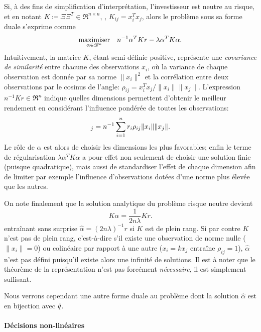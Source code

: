 Si, à des fins de simplification d'interprétation, l'investisseur est neutre au risque, et
en notant $K \coloneq \Xi\Xi^T \in \Re^{n \times n}$, \ie, $K_{ij} = x_i^Tx_j$, alors le problème sous sa
forme duale s'exprime comme
\begin{equation}
  \label{k:dualrn}
  \maximizeEquation[\alpha \in \Re^n]{n^{-1}\alpha^TKr - \lambda\alpha^TK\alpha.}
\end{equation}
Intuitivement, la matrice $K$, étant semi-définie positive, représente une
\textit{covariance de similarité} entre chacune des observations $x_i$, où la variance de
chaque observation est donnée par sa norme $\|x_i\|^2$ et la corrélation entre deux
observations par le cosinus de l'angle: $\rho_{ij} = x_i^Tx_j/\|x_i\|\|x_j\|$. L'expression
$n^{-1}Kr \in \Re^n$ indique quelles dimensions permettent d'obtenir le meilleur rendement en
considérant l'influence pondérée de toutes les observations:
\begin{equation}
  [Kr]_j = n^{-1}\sumi r_i\rho_{ij}\|x_i\|\|x_j\|.
\end{equation}
Le rôle de $\alpha$ est alors de choisir les dimensions les plus favorables; enfin le terme de
régularisation $\lambda\alpha^TK\alpha$ a pour effet non seulement de choisir une solution finie (puisque
quadratique), mais aussi de standardiser l'effet de chaque dimension afin de limiter par
exemple l'influence d'observations dotées d'une norme plus élevée que les autres.

On note finalement que la solution analytique du problème risque neutre devient
\begin{equation}
  K\alpha = \frac{1}{2n\lambda}Kr.
\end{equation}
entraînant sans surprise $\hat\alpha = (2n\lambda)^{-1}r$ si $K$ est de plein rang. Si par contre
$K$ n'est pas de plein rang, c'est-à-dire s'il existe une observation de norme nulle
($\|x_i\|=0$) ou colinéaire par rapport à une autre ($x_i = kx_j$ entraîne
$\rho_{ij} = 1$), $\hat\alpha$ n'est pas défini puisqu'il existe alors une infinité de
solutions. Il est à noter que le théorème de la représentation n'est pas forcément
\textit{nécessaire}, il est simplement suffisant.

Nous verrons cependant une autre forme duale au problème dont la solution $\hat\alpha$ est en
bijection avec $\hat q$. 


\paragraph{Décisions non-linéaires}

